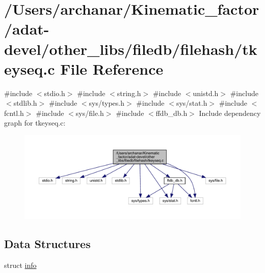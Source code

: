 \hypertarget{adat-devel_2other__libs_2filedb_2filehash_2tkeyseq_8c}{}\section{/\+Users/archanar/\+Kinematic\+\_\+factor/adat-\/devel/other\+\_\+libs/filedb/filehash/tkeyseq.c File Reference}
\label{adat-devel_2other__libs_2filedb_2filehash_2tkeyseq_8c}
{\ttfamily \#include $<$stdio.\+h$>$}\newline
{\ttfamily \#include $<$string.\+h$>$}\newline
{\ttfamily \#include $<$unistd.\+h$>$}\newline
{\ttfamily \#include $<$stdlib.\+h$>$}\newline
{\ttfamily \#include $<$sys/types.\+h$>$}\newline
{\ttfamily \#include $<$sys/stat.\+h$>$}\newline
{\ttfamily \#include $<$fcntl.\+h$>$}\newline
{\ttfamily \#include $<$sys/file.\+h$>$}\newline
{\ttfamily \#include $<$ffdb\+\_\+db.\+h$>$}\newline
Include dependency graph for tkeyseq.\+c\+:
\nopagebreak
\begin{figure}[H]
\begin{center}
\leavevmode
\includegraphics[width=350pt]{d1/dc1/adat-devel_2other__libs_2filedb_2filehash_2tkeyseq_8c__incl}
\end{center}
\end{figure}
\subsection*{Data Structures}
\begin{DoxyCompactItemize}
\item 
struct \mbox{\hyperlink{structinfo}{info}}
\end{DoxyCompactItemize}
